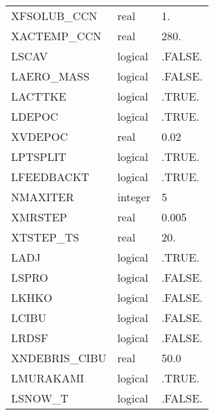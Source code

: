 \begin{longtable} {|p{}|p{}|p{}|}
XFSOLUB\_CCN & real & 1.  \\
XACTEMP\_CCN & real  & 280. \\
LSCAV & logical  & .FALSE.  \\
LAERO\_MASS & logical  & .FALSE.  \\
LACTTKE & logical  & .TRUE.  \\
LDEPOC & logical  & .TRUE.  \\
XVDEPOC &real& 0.02 \\
LPTSPLIT & logical  & .TRUE.  \\
LFEEDBACKT & logical  & .TRUE.  \\
NMAXITER & integer & 5 \\
XMRSTEP&real& 0.005 \\
XTSTEP\_TS& real&20.\\
LADJ & logical &  .TRUE. \\
LSPRO & logical & .FALSE. \\
LKHKO & logical & .FALSE. \\
LCIBU & logical & .FALSE. \\
LRDSF & logical & .FALSE. \\
XNDEBRIS\_CIBU & real & 50.0 \\
LMURAKAMI & logical & .TRUE. \\
LSNOW\_T & logical & .FALSE. \\
\end{longtable}

